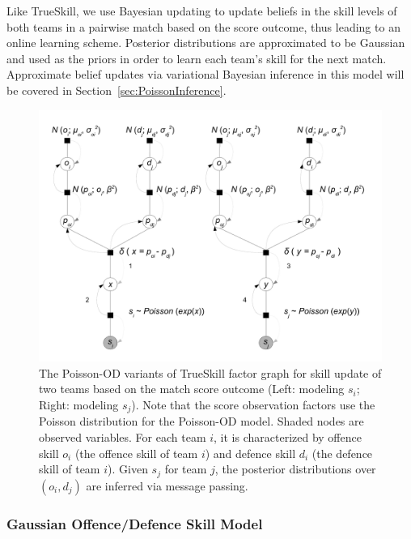 \unindentmore Like TrueSkill, we use Bayesian updating to update beliefs in the
skill levels of both teams in a pairwise match based on the score
outcome, thus leading to an online learning scheme.  Posterior
distributions are approximated to be Gaussian and used as the
priors in order to learn each team's skill for the next match.
Approximate belief updates via variational Bayesian inference in this model
will be covered in Section~\ref{sec:PoissonInference}.
%
\begin{figure}[t!]
\centerline{\includegraphics[scale=0.35]{modelAndInference}}
\caption{
The Poisson-OD variants of TrueSkill factor graph for skill update of two teams based on the match score outcome (Left: modeling $s_i$; Right: modeling $s_j$). Note that the score observation factors use the Poisson distribution for the Poisson-OD model. Shaded nodes are observed variables. For each team $i$, it is characterized by offence skill $o_{i}$ (the offence skill of team $i$) and defence skill $d_{i}$ (the defence skill of
team $i$). Given $s_j$ for team $j$, the posterior distributions over $(o_i,d_j)$ are inferred via message passing.
}
\label{fig:trueskill_variant}
\end{figure}

\subsubsection{Gaussian Offence/Defence Skill Model}

